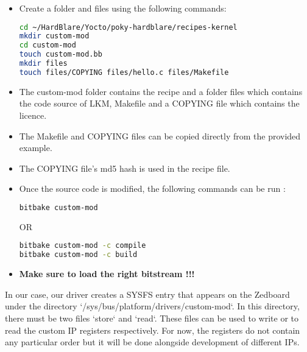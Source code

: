 \begin{itemize}
	\item Create a folder and files using the following commands:
\begin{lstlisting}[language=bash]
cd ~/HardBlare/Yocto/poky-hardblare/recipes-kernel
mkdir custom-mod
cd custom-mod
touch custom-mod.bb
mkdir files
touch files/COPYING files/hello.c files/Makefile
\end{lstlisting}
	\item The custom-mod folder contains the recipe and a folder files which contains the code source of LKM, Makefile and a COPYING file which contains the licence. 
	\item The Makefile and COPYING files can be copied directly from the provided example. 
	\item The COPYING file's md5 hash is used in the recipe file. 
	\item Once the source code is modified, the following commands can be run : 
\begin{lstlisting}[language=bash]
bitbake custom-mod
\end{lstlisting}
OR 
\begin{lstlisting}[language=bash]
bitbake custom-mod -c compile
bitbake custom-mod -c build
\end{lstlisting}

\item \textbf{Make sure to load the right bitstream !!!}
\end{itemize}

In our case, our driver creates a SYSFS entry that appears on the Zedboard under the directory `/sys/bus/platform/drivers/custom-mod`. In this directory, there must be two files `store` and `read`. These files can be used to write or to read the custom IP registers respectively. For now, the registers do not contain any particular order but it will be done alongside development of different IPs. 




